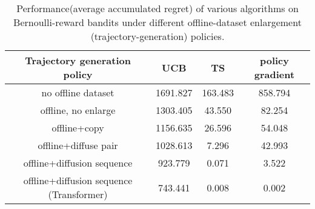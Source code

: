 \begin{table}[htbp]
    \centering
    \begin{tabular}{c c c c}
    \toprule
    Trajectory generation policy & UCB & TS & policy gradient \\
    \midrule
    no offline dataset & 1691.827 & 163.483 & 858.794 \\
    offline, no enlarge & 1303.405 & 43.550  & 82.254 \\
    offline+copy & 1156.635 & 26.596  & 54.048 \\
    offline+diffuse pair & 1028.613 & 7.296 & 42.993 \\
    offline+diffusion sequence & 923.779 & 0.071 & 3.522 \\
    offline+diffusion sequence (Transformer) & 743.441 & 0.008 & 0.002 \\
    \bottomrule
\end{tabular}
\caption{Performance(average accumulated regret) of various algorithms on Bernoulli-reward bandits under different offline-dataset enlargement (trajectory-generation) policies.}
\label{table:stochastic_bandit_pretrained}
\end{table}